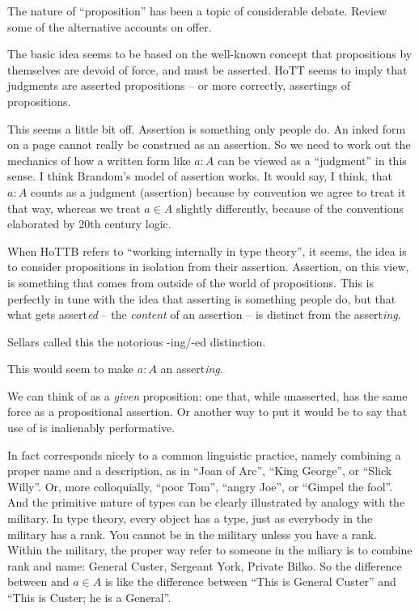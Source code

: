 {\todo The nature of ``proposition'' has been a topic of
  considerable debate.  Review some of the alternative accounts on
  offer.}


The basic idea seems to be based on the well-known concept that
propositions by themselves are devoid of force, and must be asserted.
HoTT seems to imply that judgments are asserted propositions -- or
more correctly, assertings of propositions.

This seems a little bit off.  Assertion is something only people do.
An inked form on a page cannot really be construed as an assertion.
So we need to work out the mechanics of how a written form like \(a :
A\) can be viewed as a ``judgment'' in this sense.  I think Brandom's
model of assertion works.  It would say, I think, that \(a : A\)
counts as a judgment (assertion) because by convention we agree to
treat it that way, whereas we treat \(a\in A\) slightly differently,
because of the conventions elaborated by 20th century logic.

When HoTTB refers to ``working internally in type theory'', it seems,
the idea is to consider propositions in isolation from their
assertion.  Assertion, on this view, is something that comes from
outside of the world of propositions.  This is perfectly in tune with
the idea that asserting is something people do, but that what gets
assert\textit{ed} -- the \textit{content} of an assertion -- is
distinct from the assert\textit{ing}.

\begin{remark}
  Sellars called this the notorious -ing/-ed distinction.
\end{remark}

This would seem to make \(a : A\) an assert\textit{ing}.

We can think of \atypeA{} as a \textit{given} proposition: one that,
while unasserted, has the same force as a propositional assertion.  Or
another way to put it would be to say that use of \atypeA{} is
inalienably performative.

In fact \atypeA{} corresponds nicely to a common linguistic practice,
namely combining a proper name and a description, as in ``Joan of
Arc'', ``King George'', or ``Slick Willy''.  Or, more colloquially,
``poor Tom'', ``angry Joe'', or ``Gimpel the fool''.  And the
primitive nature of types can be clearly illustrated by analogy with
the military.  In type theory, every object has a type, just as
everybody in the military has a rank.  You cannot be in the military
unless you have a rank.  Within the military, the proper way refer to
someone in the miliary is to combine rank and name: General Custer,
Sergeant York, Private Bilko.  So the difference between \atypeA{} and
\(a\in A\) is like the difference between ``This is General Custer''
and ``This is Custer; he is a General''.

